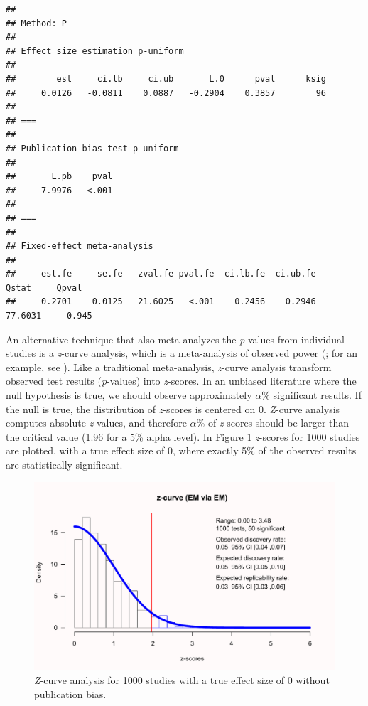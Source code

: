 \documentclass[
  oneside]{krantz}
\begin{document}
\begin{verbatim}
## 
## Method: P
## 
## Effect size estimation p-uniform
## 
##        est     ci.lb     ci.ub       L.0      pval      ksig
##     0.0126   -0.0811    0.0887   -0.2904    0.3857        96
## 
## ===
## 
## Publication bias test p-uniform
## 
##       L.pb    pval
##     7.9976   <.001
## 
## ===
## 
## Fixed-effect meta-analysis
## 
##     est.fe     se.fe   zval.fe pval.fe  ci.lb.fe  ci.ub.fe     Qstat     Qpval
##     0.2701    0.0125   21.6025   <.001    0.2456    0.2946   77.6031     0.945
\end{verbatim}

An alternative technique that also meta-analyzes the \emph{p}-values from individual studies is a \emph{z}-curve analysis, which is a meta-analysis of observed power (\citep{bartos_z-curve20_2020, brunner_estimating_2020}; for an example, see \citep{sotola_garbage_2022}). Like a traditional meta-analysis, \emph{z}-curve analysis transform observed test results (\emph{p}-values) into \emph{z}-scores. In an unbiased literature where the null hypothesis is true, we should observe approximately \(\alpha\)\% significant results. If the null is true, the distribution of \emph{z}-scores is centered on 0. \emph{Z}-curve analysis computes absolute \emph{z}-values, and therefore \(\alpha\)\% of \emph{z}-scores should be larger than the critical value (1.96 for a 5\% alpha level). In Figure \ref{fig:zcurveunbiasednull} \emph{z}-scores for 1000 studies are plotted, with a true effect size of 0, where exactly 5\% of the observed results are statistically significant.



\begin{figure}

{\centering \includegraphics[width=1\linewidth]{12-bias_files/figure-latex/zcurveunbiasednull-1} 

}

\caption{\emph{Z}-curve analysis for 1000 studies with a true effect size of 0 without publication bias.}\label{fig:zcurveunbiasednull}
\end{figure}
\end{document}
